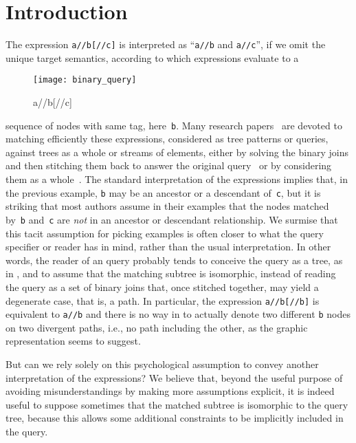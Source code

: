 
\section{Introduction}

\noindent The \XPath expression \texttt{\small a//b[//c]} is
interpreted as ``\texttt{\small a//b} and \texttt{\small a//c}'', if
we omit the unique target semantics, according to which \XPath
expressions evaluate to a 
\begin{wrapfigure}[6]{l}{40pt}
\centering
\texttt{[image: binary\_query]}
\caption{\textsf{\small a//b[//c]}\label{fig:binary_query}}
\end{wrapfigure}
sequence of nodes with same tag, here~\texttt{\small b}. Many research
papers~\cite{Cooper:2001,Li:2001,Zhang:2001} are devoted to matching
efficiently these expressions, considered as tree patterns or queries,
against \XML trees as a whole or streams of \XML elements, either by
solving the binary joins and then stitching them back to answer the
original query~\cite{AlKhalifa:2002,Chien:2002,Jiang:1:2003,Wu:2003}
or by considering them as a
whole~\cite{Bruno:2002,Jiang:2:2003,Jiao:2005}.  The standard
interpretation of the \XPath expressions implies that, in the previous
example, \texttt{\small b} may be an ancestor or a descendant
of~\texttt{\small c}, but it is striking that most authors assume in
their examples that the nodes matched by~\texttt{\small b}
and~\texttt{\small c} are \emph{not} in an ancestor or descendant
relationship. We surmise that this tacit assumption for picking
examples is often closer to what the query specifier or reader has in
mind, rather than the usual interpretation. In other words, the reader
of an \XPath query probably tends to conceive the query as a tree, as
in , and to assume that the matching subtree is
isomorphic, instead of reading the query as a set of binary joins
that, once stitched together, may yield a degenerate case, that is, a
path. In particular, the expression \texttt{\small a//b[//b]} is
equivalent to \texttt{\small a//b} and there is no way in \XPath to
actually denote two different \texttt{\small b} nodes on two divergent
paths, i.e., no path including the other, as the graphic
representation seems to suggest.

But can we rely solely on this psychological assumption to convey
another interpretation of the \XPath expressions? We believe that,
beyond the useful purpose of avoiding misunderstandings by making more
assumptions explicit, it is indeed useful to suppose sometimes that
the matched subtree is isomorphic to the query tree, because this
allows some additional constraints to be implicitly included in the
query.

